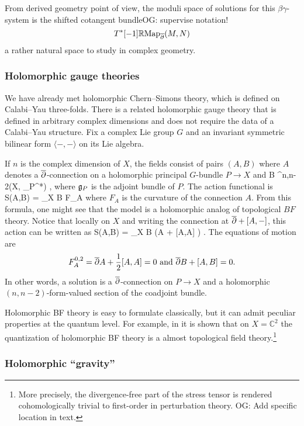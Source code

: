 \documentclass[11pt]{amsart}
\def\C{{\mathbb{C}}}
\def\owen#1{{\textcolor{violet!50!black}{OG: {#1}}}}
\begin{document}
From derived geometry point of view, the moduli space of solutions for this $\beta\gamma$-system is the shifted cotangent bundle\owen{supervise notation!}
\[
T^*[-1] \mathbb R{\rm Map}_{\overline{\partial}}(M,N) 
\]
a rather natural space to study in complex geometry.

\subsubsection{Holomorphic gauge theories}

We have already met holomorphic Chern--Simons theory, which is defined on Calabi--Yau three-folds.
There is a related holomorphic gauge theory that is defined in arbitrary complex dimensions and does not require the data of a Calabi--Yau structure. 
Fix a complex Lie group $G$ and an invariant symmetric bilinear form $\langle-,-\rangle$ on its Lie algebra.

If $n$ is the complex dimension of $X$, 
the fields consist of pairs $(A,B)$ where $A$ denotes a ${\overline{\partial}}$-connection on a holomorphic principal $G$-bundle $P \to X$ and
\beqn
B \in \Omega^{n,n-2}(X, \fg_P^*) ,
\eeqn
where $\mathfrak g_P$ is the adjoint bundle of $P$. 
The action functional is 
\beqn
S(A,B) = \int_X \langle B \wedge F_A \rangle
\eeqn
where $F_A$ is the curvature of the connection $A$.
From this formula, one might see that the model is a holomorphic analog of topological $BF$ theory. 
Notice that locally on $X$ and
writing the connection at ${\overline{\partial}} + [A,-]$, this action can be written as
\beqn
S(A,B) = \int_X \langle B \wedge \left(\dbar A +  [A,A]  \right) \rangle.
\eeqn
The equations of motion are
\[
F_A^{0,2} = {\overline{\partial}} A + \frac12 [A,A] = 0 \text{ and } {\overline{\partial}} B + [A,B] = 0.
\]
In other words, a solution is a ${\overline{\partial}}$-connection on $P\to X$ and a holomorphic $(n,n-2)$-form-valued section of the coadjoint bundle.

Holomorphic BF theory is easy to formulate classically, but it can admit peculiar properties at the quantum level.
For example, in \cite{semichiral} it is shown that on $X = \C^2$ the quantization of holomorphic BF theory is a almost topological field theory.\footnote{More precisely, the divergence-free part of the stress tensor is rendered cohomologically trivial to first-order in perturbation theory. \owen{Add specific location in text.}}

\subsubsection{Holomorphic ``gravity''}
\end{document}
